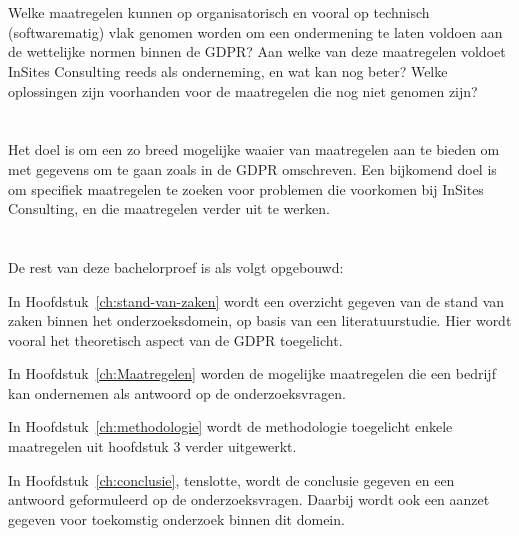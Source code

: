 \section{}
\label{sec:onderzoeksvraag}

Welke maatregelen kunnen op organisatorisch en vooral op technisch (softwarematig) vlak genomen worden om een ondermening te laten voldoen aan de wettelijke normen binnen de GDPR? Aan welke van deze maatregelen voldoet InSites Consulting reeds als onderneming, en wat kan nog beter? Welke oplossingen zijn voorhanden voor de maatregelen die nog niet genomen zijn?

\section{}
\label{sec:onderzoeksdoelstelling}

Het doel is om een zo breed mogelijke waaier van maatregelen aan te bieden om met gegevens om te gaan zoals in de GDPR omschreven. 
Een bijkomend doel is om specifiek maatregelen te zoeken voor problemen die voorkomen bij InSites Consulting, en die maatregelen verder uit te werken. 

\section{}
\label{sec:opzet-bachelorproef}


De rest van deze bachelorproef is als volgt opgebouwd:

In Hoofdstuk~\ref{ch:stand-van-zaken} wordt een overzicht gegeven van de stand van zaken binnen het onderzoeksdomein, op basis van een literatuurstudie. Hier wordt vooral het theoretisch aspect van de GDPR toegelicht. 

In Hoofdstuk~\ref{ch:Maatregelen} worden de mogelijke maatregelen die een bedrijf kan ondernemen als antwoord op de onderzoeksvragen. 

In Hoofdstuk~\ref{ch:methodologie} wordt de methodologie toegelicht enkele maatregelen uit hoofdstuk 3 verder uitgewerkt.


In Hoofdstuk~\ref{ch:conclusie}, tenslotte, wordt de conclusie gegeven en een antwoord geformuleerd op de onderzoeksvragen. Daarbij wordt ook een aanzet gegeven voor toekomstig onderzoek binnen dit domein.